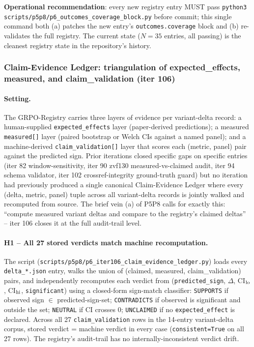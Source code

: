 \documentclass{article}
\begin{document}
\textbf{Operational recommendation}: every new registry entry MUST pass
\texttt{python3 scripts/p5p8/p6_outcomes\_coverage\_block.py} before
commit; this single command both (a) patches the new entry's
\texttt{outcomes.coverage} block and (b) re-validates the full registry.
The current state ($N{=}35$ entries, all passing) is the cleanest
registry state in the repository's history. 

\subsubsection{Claim-Evidence Ledger: triangulation of expected\_effects, measured, and claim\_validation (iter 106)}
\label{sec:p6-iter106-claim-evidence-ledger}

\paragraph{Setting.}
The GRPO-Registry carries three layers of evidence per variant-delta record:
a human-supplied \texttt{expected\_effects} layer (paper-derived predictions);
a measured \texttt{measured[]} layer (paired bootstrap or Welch CIs against a
named panel); and a machine-derived \texttt{claim\_validation[]} layer that
scores each (metric, panel) pair against the predicted sign. Prior iterations
closed specific gaps on specific entries (iter 82 window-sensitivity, iter 90
zvf130 measured-vs-claimed audit, iter 94 schema validator, iter 102
crossref-integrity ground-truth guard) but no iteration had previously
produced a single canonical Claim-Evidence Ledger where every (delta, metric,
panel) tuple across all variant-delta records is jointly walked and
recomputed from source. The brief vein (a) of P5P8 calls for exactly this:
``compute measured variant deltas and compare to the registry's claimed
deltas'' -- iter 106 closes it at the full audit-trail level.

\paragraph{H1 -- All 27 stored verdicts match machine recomputation.}
The script (\texttt{scripts/p5p8/p6\_iter106\_claim\_evidence\_ledger.py})
loads every \texttt{delta\_*.json} entry, walks the union of (claimed,
measured, claim\_validation) pairs, and independently recomputes each verdict
from (\texttt{predicted\_sign}, $\Delta$, CI$_{\rm lo}$, CI$_{\rm hi}$,
\texttt{significant}) using a closed-form sign-match classifier:
\texttt{SUPPORTS} if observed sign $\in$ predicted-sign-set;
\texttt{CONTRADICTS} if observed is significant and outside the set;
\texttt{NEUTRAL} if CI crosses 0; \texttt{UNCLAIMED} if no
\texttt{expected\_effect} is declared. Across all 27
\texttt{claim\_validation} rows in the 14-entry variant-delta corpus,
stored verdict = machine verdict in every case (\texttt{consistent=True} on
all 27 rows). The registry's audit-trail has no internally-inconsistent
verdict drift.
\end{document}
